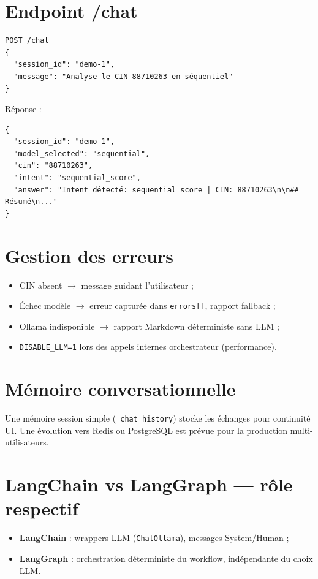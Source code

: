 \section{Endpoint /chat}

\begin{lstlisting}[caption={Exemple requête /chat}]
POST /chat
{
  "session_id": "demo-1",
  "message": "Analyse le CIN 88710263 en séquentiel"
}
\end{lstlisting}

Réponse :
\begin{lstlisting}[caption={Exemple réponse /chat}]
{
  "session_id": "demo-1",
  "model_selected": "sequential",
  "cin": "88710263",
  "intent": "sequential_score",
  "answer": "Intent détecté: sequential_score | CIN: 88710263\n\n## Résumé\n..."
}
\end{lstlisting}

\section{Gestion des erreurs}

\begin{itemize}[leftmargin=*]
  \item CIN absent $\rightarrow$ message guidant l'utilisateur ;
  \item Échec modèle $\rightarrow$ erreur capturée dans \texttt{errors[]}, rapport fallback ;
  \item Ollama indisponible $\rightarrow$ rapport Markdown déterministe sans LLM ;
  \item \texttt{DISABLE\_LLM=1} lors des appels internes orchestrateur (performance).
\end{itemize}

\section{Mémoire conversationnelle}

Une mémoire session simple (\texttt{\_chat\_history}) stocke les échanges pour continuité UI. Une évolution vers Redis ou PostgreSQL est prévue pour la production multi-utilisateurs.

\section{LangChain vs LangGraph — rôle respectif}

\begin{itemize}[leftmargin=*]
  \item \textbf{LangChain} : wrappers LLM (\texttt{ChatOllama}), messages System/Human ;
  \item \textbf{LangGraph} : orchestration déterministe du workflow, indépendante du choix LLM.
\end{itemize}

